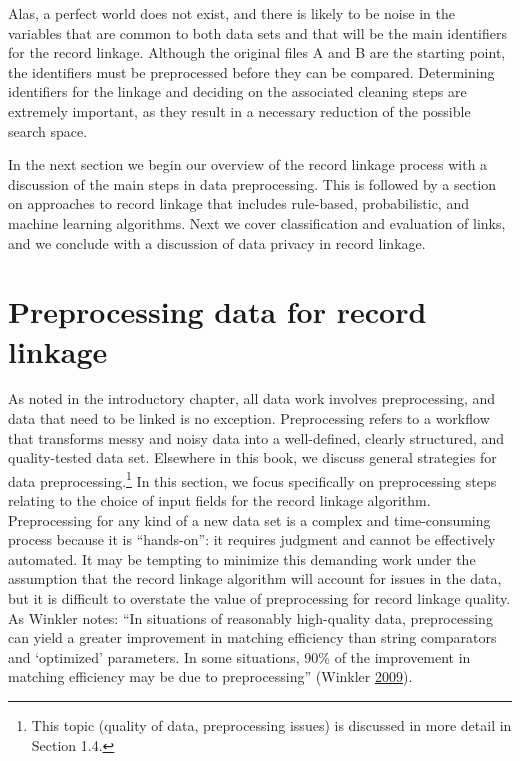 \documentclass[]{krantz}
\begin{document}
Alas, a perfect world does not exist, and there is likely to be noise in
the variables that are common to both data sets and that will be the
main identifiers for the record linkage. Although the original files A
and B are the starting point, the identifiers must be preprocessed
before they can be compared. Determining identifiers for the linkage and
deciding on the associated cleaning steps are extremely important, as
they result in a necessary reduction of the possible search space.

In the next section we begin our overview of the record linkage process
with a discussion of the main steps in data preprocessing. This is
followed by a section on approaches to record linkage that includes
rule-based, probabilistic, and machine learning algorithms. Next we
cover classification and evaluation of links, and we conclude with a
discussion of data privacy in record linkage.

\section{Preprocessing data for record
linkage}\label{preprocessing-data-for-record-linkage}

As noted in the introductory chapter, all data work involves
preprocessing, and data that need to be linked is no exception.
Preprocessing refers to a workflow that transforms messy and noisy data
into a well-defined, clearly structured, and quality-tested data set.
Elsewhere in this book, we discuss general strategies for data
preprocessing.\footnote{This topic (quality of data, preprocessing
  issues) is discussed in more detail in Section 1.4.} In this section,
we focus specifically on preprocessing steps relating to the choice of
input fields for the record linkage algorithm. Preprocessing for any
kind of a new data set is a complex and time-consuming process because
it is ``hands-on'': it requires judgment and cannot be effectively
automated. It may be tempting to minimize this demanding work under the
assumption that the record linkage algorithm will account for issues in
the data, but it is difficult to overstate the value of preprocessing
for record linkage quality. As Winkler notes: ``In situations of
reasonably high-quality data, preprocessing can yield a greater
improvement in matching efficiency than string comparators and
`optimized' parameters. In some situations, 90\% of the improvement in
matching efficiency may be due to preprocessing'' (Winkler
\protect\hyperlink{ref-winkler09}{2009}).
\end{document}
